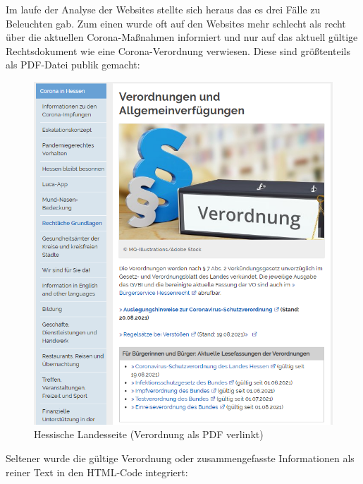 \documentclass[12pt,oneside,a4paper,parskip]{scrbook}
\begin{document}
Im laufe der Analyse der Websites stellte sich heraus das es drei Fälle zu Beleuchten gab. Zum einen wurde oft auf den Websites mehr schlecht als recht über die aktuellen Corona-Maßnahmen informiert und nur auf das aktuell gültige Rechtsdokument wie eine Corona-Verordnung verwiesen. Diese sind größtenteils als PDF-Datei publik gemacht:
\begin{figure}[H]
\caption{Hessische Landesseite (Verordnung als PDF verlinkt)}
\label{websiteHessen}
\centering
\includegraphics[scale=0.9]{pictures/hessenOverview.png}
\end{figure}

Seltener wurde die gültige Verordnung oder zusammengefasste Informationen als reiner Text in den HTML-Code integriert:
\end{document}
